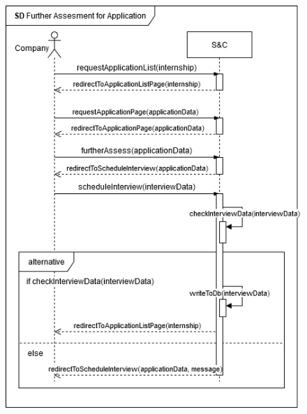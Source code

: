 \begin{enumerate}[label=\textbf{[US\arabic*]}, left = 0pt, align = left, resume]
            \newpage
            \begin{figure}[h!]
                \centering  \includegraphics[width=1\textwidth]{RASD/Images/UseCases/US15_FurtherAssessment.drawio.png}
                \label{fig:example}
            \end{figure}
            
        \end{enumerate}

    \newpage

